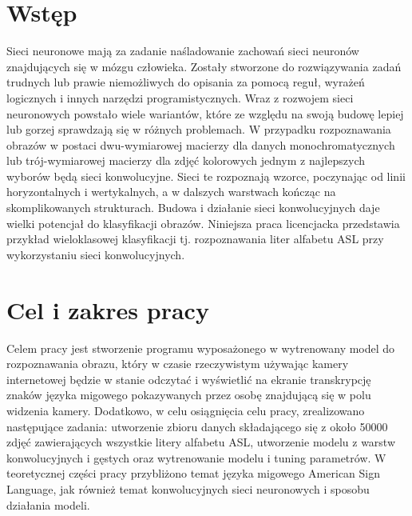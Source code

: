 \documentclass[a4paper,12pt,oneside]{book} %
\begin{document}
\sloppy
\thispagestyle{empty}

\newpage{}

\thispagestyle{empty}
\newpage{}

\tableofcontents{}

\chapter*{Wstęp}
\label{Wstep}
Sieci neuronowe mają za zadanie naśladowanie zachowań sieci neuronów znajdujących się w mózgu człowieka. Zostały stworzone do rozwiązywania zadań trudnych lub prawie niemożliwych do opisania za pomocą reguł, wyrażeń logicznych i innych narzędzi programistycznych. Wraz z rozwojem sieci neuronowych powstało wiele wariantów, które ze względu na swoją budowę lepiej lub gorzej sprawdzają się w różnych problemach. W przypadku rozpoznawania obrazów w postaci dwu-wymiarowej macierzy dla danych monochromatycznych lub trój-wymiarowej macierzy dla zdjęć kolorowych jednym z najlepszych wyborów będą sieci konwolucyjne. Sieci te rozpoznają wzorce, poczynając od linii horyzontalnych i wertykalnych, a w dalszych warstwach kończąc na skomplikowanych strukturach. Budowa i działanie sieci konwolucyjnych daje wielki potencjał do klasyfikacji obrazów. Niniejsza praca licencjacka przedstawia przykład wieloklasowej klasyfikacji tj. rozpoznawania liter alfabetu ASL przy wykorzystaniu sieci konwolucyjnych.

\chapter*{Cel i zakres pracy}
\label{Cel i zakres pracy}
Celem pracy jest stworzenie programu wyposażonego w wytrenowany model do rozpoznawania obrazu, który w czasie rzeczywistym używając kamery internetowej będzie w stanie odczytać i wyświetlić na ekranie transkrypcję znaków języka migowego pokazywanych przez osobę znajdującą się w polu widzenia kamery. Dodatkowo, w celu osiągnięcia celu pracy, zrealizowano następujące zadania: utworzenie zbioru danych składającego się z około 50000 zdjęć zawierających wszystkie litery alfabetu ASL, utworzenie modelu z warstw konwolucyjnych i gęstych oraz wytrenowanie modelu i tuning parametrów. W teoretycznej części pracy przybliżono temat języka migowego American Sign Language, jak również temat konwolucyjnych sieci neuronowych i sposobu działania modeli.
\end{document}
